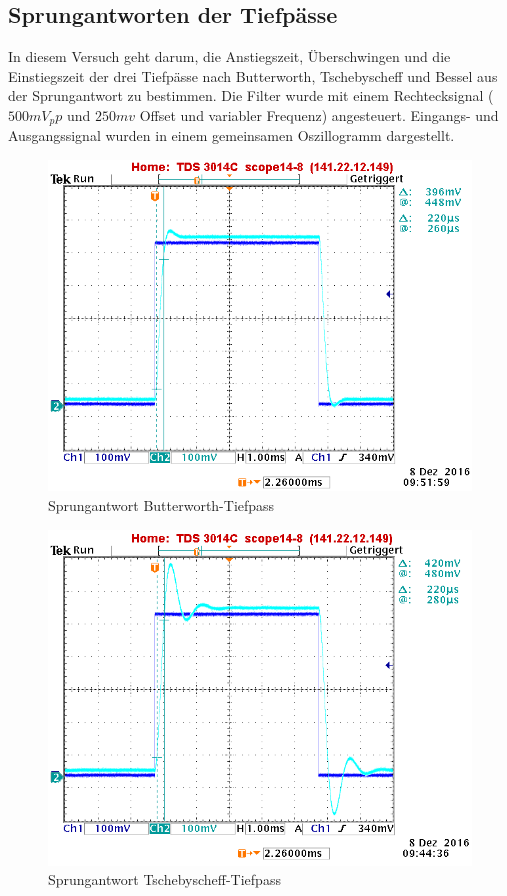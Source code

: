 \newpage

\subsection{Sprungantworten der Tiefpässe}
\noindent In diesem Versuch geht darum, die Anstiegszeit, Überschwingen und die Einstiegszeit der drei Tiefpässe nach Butterworth, Tschebyscheff und Bessel aus der Sprungantwort zu bestimmen. Die Filter wurde mit einem Rechtecksignal ($500mV_pp$ und $250mv$ Offset und variabler Frequenz) angesteuert. Eingangs- und Ausgangssignal wurden in einem gemeinsamen Oszillogramm dargestellt. 

\begin{figure}[h]
\centering
\includegraphics[width=0.7\linewidth]{Bilder/ImLabor/Sprungantwort_5_8_Butter_Anstiegszeit}
\caption{Sprungantwort Butterworth-Tiefpass}
\label{fig:Sprungantwort_5_8_Butter_Anstiegszeit}
\end{figure}

\begin{figure}[h]
\centering
\includegraphics[width=0.7\linewidth]{Bilder/ImLabor/Sprungantwort_5_3_Tscheby_Anstiegszeit}
\caption{Sprungantwort Tschebyscheff-Tiefpass}
\label{fig:Sprungantwort_5_3_Tscheby_Anstiegszeit}
\end{figure}

